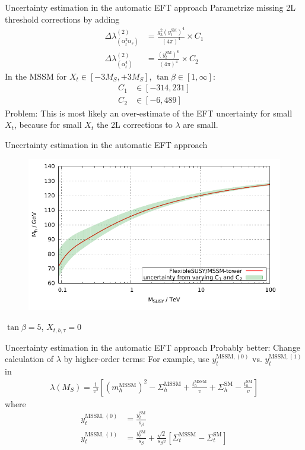 \documentclass[hyperref={pdfpagelabels=false},ngerman]{beamer}
\newcommand{\SM}{\ensuremath{\text{SM}}}
\newcommand{\MSSM}{\ensuremath{\text{MSSM}}}
\begin{document}
\begin{frame}{Uncertainty estimation in the automatic EFT approach}
  Parametrize missing 2L threshold corrections by adding
  \begin{align*}
    \Delta\lambda^{(2)}_{(\alpha_t^2 \alpha_s)}
    &= \frac{g_3^2 (y_t^\SM)^4}{(4\pi)^4} \times C_1 \\
    \Delta\lambda^{(2)}_{(\alpha_t^4)}
    &= \frac{(y_t^\SM)^6}{(4\pi)^4} \times C_2
  \end{align*}
  In the MSSM for $X_t\in [-3M_S,+3M_S]$, $\tan\beta \in [1,\infty]$:
  \begin{align*}
    C_1&\in[-314, 231] \\ C_2&\in[-6, 489]
  \end{align*}
  Problem: This is most likely an over-estimate of the EFT uncertainty
  for small $X_t$, because for small $X_t$ the 2L corrections to
  $\lambda$ are small.
\end{frame}

\begin{frame}{Uncertainty estimation in the automatic EFT approach}
  \begin{figure}
    \centering
    \includegraphics[width=\textwidth]{plots/scale_MSSM_uncertainty_tower_C1C2}
  \end{figure}
  $\tan\beta = 5$, $X_{t,b,\tau} = 0$
\end{frame}

\begin{frame}{Uncertainty estimation in the automatic EFT approach}
  Probably better: Change calculation of $\lambda$ by higher-order
  terms: For example, use $y_t^{\text{MSSM},(0)}$
  vs. $y_t^{\text{MSSM},(1)}$ in
  \begin{align*}
    \lambda(M_S) = \frac{1}{v^2} \left[
      (m_h^\text{MSSM})^2 - \Sigma^{\MSSM}_h + \frac{t_h^\text{MSSM}}{v}
      + \Sigma^{\SM}_h - \frac{t_h^\SM}{v}
    \right]
  \end{align*}
  where
  \begin{align*}
    y_t^{\text{MSSM},(0)} &= \frac{y_t^{\SM}}{s_\beta} \\
    y_t^{\text{MSSM},(1)} &= \frac{y_t^{\SM}}{s_\beta} + \frac{\sqrt{2}}{s_\beta v}
    \left[ \Sigma_t^{\text{MSSM}} - \Sigma_t^{\SM} \right]
  \end{align*}
\end{frame}
\end{document}

